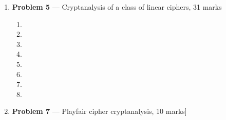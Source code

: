 \documentclass[11pt]{article}
\theoremstyle{definition}
\begin{document}
\begin{enumerate}
\begin{enumerate}
\item %

\begin{enumerate}

\item %

\item %

\end{enumerate}
\end{enumerate}


\item[] \textbf{Problem 5} --- Cryptanalysis of a class of linear ciphers, 31 marks


\begin{enumerate}
\item %

\item %

\item %

\item %

\item %

\item %

\item %

\item %
\end{enumerate}


\item[] \textbf{Problem 7} --- Playfair cipher cryptanalysis, 10 marks]

\end{enumerate}
\end{document}
